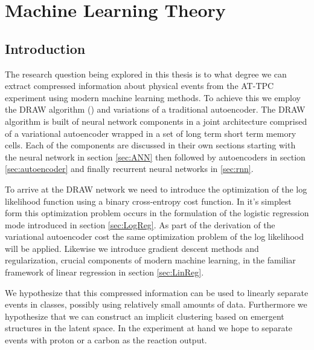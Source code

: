 \chapter{Machine Learning Theory}\label{ch:ml}
\section{Introduction}

The research question being explored in this thesis is to what degree we can extract compressed information about physical events from the AT-TPC experiment using modern machine learning methods. To achieve this we employ the DRAW algorithm (\cite{Gregor2015}) and variations of a traditional autoencoder. The DRAW algorithm is built of neural network components in a joint architecture comprised of a variational autoencoder wrapped in a set of long term short term memory cells. Each  of the components are discussed in their own sections starting with the neural network in  section \ref{sec:ANN} then followed by autoencoders in section \ref{sec:autoencoder} and finally recurrent neural networks in \ref{sec:rnn}. 

To arrive at the DRAW network we need to introduce the optimization of the log likelihood function using a binary cross-entropy cost function. In it's simplest form this optimization problem occurs in the formulation of the logistic regression mode introduced in section \ref{sec:LogReg}. As part of the derivation of the variational autoencoder cost the same optimization problem of the log likelihood will be applied. Likewise we introduce gradient descent methods and regularization, crucial components of modern machine learning, in the familiar framework of linear regression in section \ref{sec:LinReg}. 

We hypothesize that this compressed information can be used to linearly separate events in classes, possibly using relatively small amounts of data. Furthermore we hypothesize that we can construct an implicit clustering based on emergent structures in the latent space. In the experiment at hand we hope to separate events with proton or a carbon as the reaction output. 